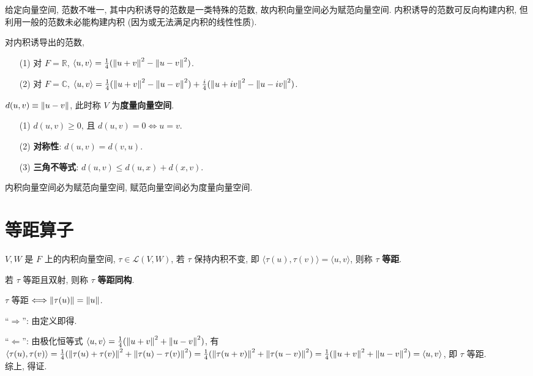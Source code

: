 \documentclass{note}
\begin{document}
给定向量空间, 范数不唯一, 其中内积诱导的范数是一类特殊的范数, 故内积向量空间必为赋范向量空间. 内积诱导的范数可反向构建内积, 但利用一般的范数未必能构建内积 (因为或无法满足内积的线性性质).

\begin{thm}
    对内积诱导出的范数,
    \begin{itemize}
        \item[(1)] 对 $F=\mathbb{R}$, $\langle u,v\rangle=\frac{1}{4}(\left\lVert u+v\right\rVert^2-\left\lVert u-v\right\rVert^2)$.
        \item[(2)] 对 $F=\mathbb{C}$, $\langle u,v\rangle=\frac{1}{4}(\left\lVert u+v\right\rVert^2-\left\lVert u-v\right\rVert^2)+\frac{i}{4}(\left\lVert u+iv\right\rVert^2-\left\lVert u-iv\right\rVert^2)$.
    \end{itemize}
\end{thm}

\begin{df}[度量/距离]
    $d(u,v)\equiv\left\lVert u-v\right\rVert$, 此时称 $V$ 为\textbf{度量向量空间}.
\end{df}

\begin{thm}
    \begin{itemize}
        \item[(1)] $d(u,v)\geq 0$, 且 $d(u,v)=0\Longleftrightarrow u=v$.
        \item[(2)] \textbf{对称性}: $d(u,v)=d(v,u)$.
        \item[(3)] \textbf{三角不等式}: $d(u,v)\leq d(u,x)+d(x,v)$.
    \end{itemize}
\end{thm}

内积向量空间必为赋范向量空间, 赋范向量空间必为度量向量空间.

\section{等距算子}
\begin{df}[等距]
    $V,W$ 是 $F$ 上的内积向量空间, $\tau\in\mathcal{L}(V,W)$, 若 $\tau$ 保持内积不变, 即 $\langle\tau(u),\tau(v)\rangle=\langle u,v\rangle$, 则称 $\tau$ \textbf{等距}.
\end{df}

\begin{df}[等距同构]
    若 $\tau$ 等距且双射, 则称 $\tau$ \textbf{等距同构}.
\end{df}

\begin{thm}[(课本定理 9.5)]
    $\tau$ 等距 $\Longleftrightarrow\left\lVert\tau(u)\right\rVert=\left\lVert u\right\rVert$.
\end{thm}
\begin{pf}
    ``$\Longrightarrow$'': 由定义即得.

    ``$\Longleftarrow$'': 由极化恒等式 $\langle u,v\rangle=\frac{1}{4}(\left\lVert u+v\right\rVert^2+\left\lVert u-v\right\rVert^2)$, 有 $\langle\tau(u),\tau(v)\rangle=\frac{1}{4}(\left\lVert\tau(u)+\tau(v)\right\rVert^2+\left\lVert\tau(u)-\tau(v)\right\rVert^2)=\frac{1}{4}(\left\lVert\tau(u+v)\right\rVert^2+\left\lVert\tau(u-v)\right\rVert^2)=\frac{1}{4}(\left\lVert u+v\right\rVert^2+\left\lVert u-v\right\rVert^2)=\langle u,v\rangle$, 即 $\tau$ 等距.\\

    综上, 得证.
\end{pf}
\end{document}
